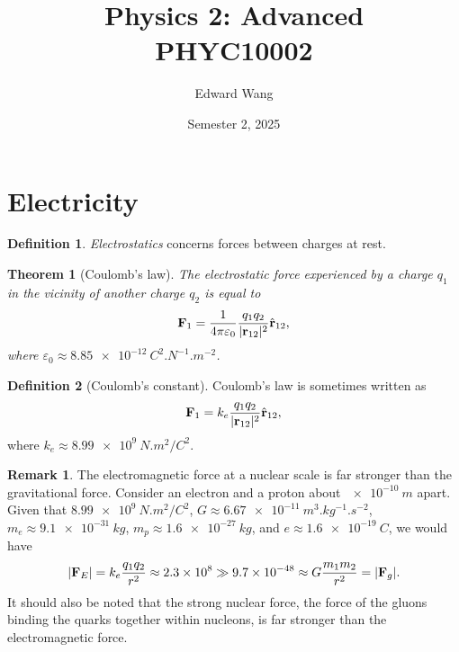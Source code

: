 \documentclass[a4paper]{scrartcl}
\newtheorem{theorem}{Theorem}
\theoremstyle{definition}
\newtheorem{definition}{Definition}
\newtheorem{remark}{Remark}
\DeclarePairedDelimiter\abs{\lvert}{\rvert}
\let\epsilon\varepsilon
\let\vec\mathbf
\begin{document}
\title{Physics 2: Advanced \\ PHYC10002}
\author{Edward Wang}
\date{Semester 2, 2025}
\maketitle

\tableofcontents

\section{Electricity}
\begin{definition}
  \emph{Electrostatics} concerns forces between charges at rest.
\end{definition}
\begin{theorem}[Coulomb's law]
  The electrostatic force experienced by a charge $q_1$ in the vicinity of another charge $q_2$ is equal to \[
    \vec{F}_{1} = \frac{1}{4\pi \epsilon_0} \frac{q_1q_2}{\abs{\vec{r}_{12}}^2}\hat{\vec{r}}_{12},
  \] 
  where $\epsilon_0 \approx \qty{8.85e-12}{C^2.N^{-1}.m^{-2}}$.
\end{theorem}
\begin{definition}[Coulomb's constant]
  Coulomb's law is sometimes written as \[
    \vec{F}_{1} = k_e\frac{q_1q_2}{\abs{\vec{r}_{12}}^2}\hat{\vec{r}}_{12},
  \] 
  where $k_e \approx \qty{8.99e9}{N.m^2/C^2}$.
\end{definition}
\begin{remark}
  The electromagnetic force at a nuclear scale is far stronger than the gravitational force. Consider an electron and a proton about $\qty{e-10}{m}$ apart. Given that $\qty{8.99e9}{N.m^2/C^2}$, $G\approx \qty{6.67e-11}{m^3.kg^{-1}.s^{-2}}$, $m_e \approx \qty{9.1e-31}{kg}$, $m_p \approx \qty{1.6e-27}{kg}$, and $e \approx \qty{1.6e-19}{C}$, we would have  \[
    \abs{\vec{F}_E} = k_e\frac{q_1q_2}{r^2} \approx 2.3 \times 10^{8} \gg 9.7 \times 10^{-48} \approx G \frac{m_1m_2}{r^2} = \abs{\vec{F}_g}.
  \] 
  It should also be noted that the strong nuclear force, the force of the gluons binding the quarks together within nucleons, is far stronger than the electromagnetic force.
\end{remark}
\end{document}
